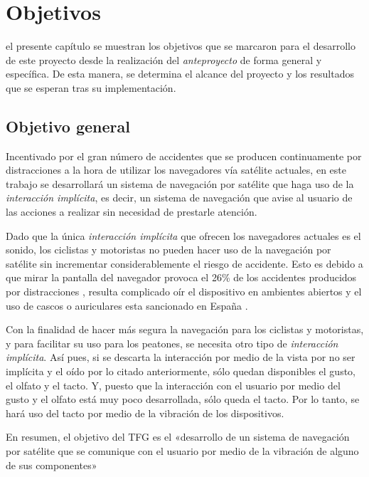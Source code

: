 \chapter{Objetivos}
\label{chap:objetivos}

 el presente capítulo se muestran los objetivos que se marcaron para el desarrollo de
este proyecto desde la realización del \emph{anteproyecto} de forma general y específica. De esta
manera, se determina el alcance del proyecto y los resultados que se esperan tras su implementación.

\section{Objetivo general}

Incentivado por el gran número de accidentes que se producen continuamente por distracciones a la
hora de utilizar los navegadores vía satélite actuales, en este trabajo se desarrollará un sistema
de navegación por satélite que haga uso de la \emph{interacción implícita}, es decir, un sistema de
navegación que avise al usuario de las acciones a realizar sin necesidad de prestarle atención.

Dado que la única \emph{interacción implícita} que ofrecen los navegadores actuales es el sonido,
los ciclistas y motoristas no pueden hacer uso de la navegación por satélite sin incrementar
considerablemente el riesgo de accidente. Esto es debido a que mirar la pantalla del navegador
provoca el 26\% de los accidentes producidos por distracciones \cite{Allianz14}, resulta complicado
oír el dispositivo en ambientes abiertos y el uso de cascos o auriculares esta sancionado en
España \cite{Serrano14}.

Con la finalidad de hacer más segura la navegación para los ciclistas y motoristas, y para facilitar
su uso para los peatones, se necesita otro tipo de \emph{interacción implícita}. Así pues, si se
descarta la interacción por medio de la vista por no ser implícita y el oído por lo citado
anteriormente, sólo quedan disponibles el gusto, el olfato y el tacto. Y, puesto que la
interacción con el usuario por medio del gusto y el olfato está muy poco desarrollada, sólo queda el
tacto. Por lo tanto, se hará uso del tacto por medio de la vibración de los dispositivos.

En resumen, el objetivo del \acf{TFG} es el «desarrollo de un sistema de navegación
  por satélite que se comunique con el usuario por medio de la vibración de alguno de sus
  componentes»


